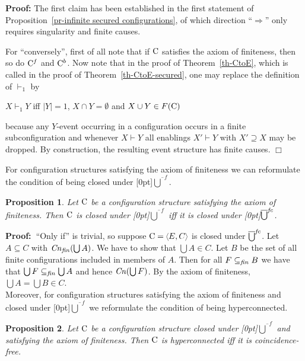 \documentclass[twocolumn]{article}
\newtheorem{prop}{Proposition}[section]
\newenvironment{proposition}[1]{\begin{prop} \rm \label{pr-#1} }{\end{prop}}
\newenvironment{proof}{\begin{trivlist} \item[\hspace{\labelsep}\bf
Proof:]}{\hfill $\Box$\end{trivlist}}
\newcommand{\thm}[1]{Theorem~\ref{th-#1}}
\newcommand{\pr}[1]{Proposition~\ref{pr-#1}}
\newcommand{\turn}{\vdash}                              \newcommand{\dbigcup}{\bigcup_{\uparrow}}		\newcommand{\nbigcup}{\bigcup_{\bullet}}		\newcommand{\nbigcap}{\bigcap_{\bullet}}		\newcommand{\bbigcup}{\overline{\bigcup}}		\newcommand{\bbigcap}{\overline{\bigcap}}		\newcommand{\nbbigcap}{\bbigcap_{\bullet}}		\newcommand{\fbbigcup}{\overline{\bigcup}^f}		\newcommand{\bbbigcup}{\overline{\bigcup}^2}		\newcommand{\dcup}{~~\makebox[0pt]{\LARGE$\cdot$}\makebox[0pt]{$\cup$}~~}
\newcommand{\pf}{{\bf Proof:\ }}
\begin{document}
\begin{proof}
The first claim has been established in the first statement of
\pr{infinite secured configurations}, of which direction
``$\Rightarrow$'' only requires singularity and finite causes.

For ``conversely'', first of all note that if ${\rm C}$ satisfies the axiom of
finiteness, then so do ${\rm C}^f$ and ${\rm C}^b$. Now note that in the
proof of \thm{CtoE}, which is called in the proof of \thm{CtoE-secured},
one may replace the definition of $\turn_1$ by
\begin{center}
$X \turn_1 Y$ iff $|Y| = 1$, $X \cap Y = \emptyset$ and $X \cup Y\in F({\rm C})$
\end{center}
because any $Y$-event occurring in a configuration occurs in a finite
subconfiguration and whenever $X\turn Y$ all enablings $X'\turn Y$
with $X'\supseteq X$ may be dropped. By construction, the resulting event
structure has finite causes.
\end{proof}
For configuration structures satisfying the axiom of finiteness we can
reformulate the condition of being closed under
\raisebox{-1.5pt}[0pt]{$\bbigcup^f$}.

\begin{proposition}{finite-completeness}
Let ${\rm C}$ be a configuration structure satisfying the axiom of finiteness.
Then ${\rm C}$ is closed under \raisebox{-2pt}[0pt]{$\bbigcup^f$} iff it
is closed under \raisebox{-1.5pt}[0pt]{$\bbigcup^{\it fc}$}.
\end{proposition}
\pf ``Only if'' is trivial, so suppose $\eC=\tuple{E,C}$ is closed under 
$\bbigcup^{\it fc}$. Let $A\subseteq C$ with ${\it Cn}_{\it fin}(\bigcup A)$. We
have to show that $\bigcup A \in C$. Let $B$ be the set of all finite
configurations included in members of $A$. Then for all $F
\subseteq_{\it fin} B$ we have that $\bigcup F \subseteq_{\it fin}
\bigcup A$ and hence ${\it Cn}(\bigcup F)$.
By the axiom of finiteness, $\bigcup A = \bigcup B \in C$.\\[1em]
Moreover, for configuration structures satisfying the axiom of
finiteness and closed under \raisebox{-1.5pt}[0pt]{$\bbigcup^f$} we
reformulate the condition of being hyperconnected.

\begin{proposition}{coincidence-freeness-hyperconnectedness}
Let ${\rm C}$ be a configuration structure closed under
\raisebox{-1.5pt}[0pt]{$\bbigcup^f$} and satisfying the axiom of
finiteness.  Then ${\rm C}$ is hyperconnected iff it is coincidence-free.
\end{proposition}
\end{document}
